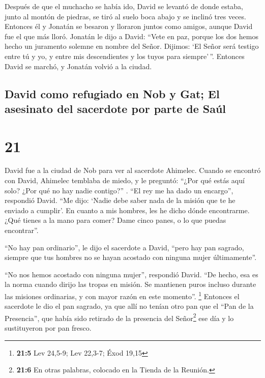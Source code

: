  Después de que el muchacho se había ido, David se
levantó de donde estaba, junto al montón de piedras, se tiró al suelo
boca abajo y se inclinó tres veces. Entonces él y Jonatán se besaron y
lloraron juntos como amigos, aunque David fue el que más lloró.
 Jonatán le dijo a David: ``Vete en paz, porque los dos
hemos hecho un juramento solemne en nombre del Señor. Dijimos: `El Señor
será testigo entre tú y yo, y entre mis descendientes y los tuyos para
siempre'\,''. Entonces David se marchó, y Jonatán volvió a la ciudad.

\hypertarget{david-como-refugiado-en-nob-y-gat-el-asesinato-del-sacerdote-por-parte-de-sauxfal}{%
\subsection{David como refugiado en Nob y Gat; El asesinato del
sacerdote por parte de
Saúl}\label{david-como-refugiado-en-nob-y-gat-el-asesinato-del-sacerdote-por-parte-de-sauxfal}}

\hypertarget{section-20}{%
\section{21}\label{section-20}}

 David fue a la ciudad de Nob para ver al sacerdote
Ahimelec. Cuando se encontró con David, Ahimelec temblaba de miedo, y le
preguntó: ``¿Por qué estás aquí solo? ¿Por qué no hay nadie contigo?'' .
 ``El rey me ha dado un encargo'', respondió David. ``Me
dijo: `Nadie debe saber nada de la misión que te he enviado a cumplir'.
En cuanto a mis hombres, les he dicho dónde encontrarme. 
¿Qué tienes a la mano para comer? Dame cinco panes, o lo que puedas
encontrar''.

 ``No hay pan ordinario'', le dijo el sacerdote a David,
``pero hay pan sagrado, siempre que tus hombres no se hayan acostado con
ninguna mujer últimamente''.

 ``No nos hemos acostado con ninguna mujer'', respondió
David. ``De hecho, esa es la norma cuando dirijo las tropas en misión.
Se mantienen puros incluso durante las misiones ordinarias, y con mayor
razón en este momento''. \footnote{\textbf{21:5} Lev 24,5-9; Lev 22,3-7;
  Éxod 19,15}  Entonces el sacerdote le dio el pan
sagrado, ya que allí no tenían otro pan que el ``Pan de la Presencia'',
que había sido retirado de la presencia del Señor\footnote{\textbf{21:6}
  En otras palabras, colocado en la Tienda de la Reunión.} ese día y lo
sustituyeron por pan fresco.

